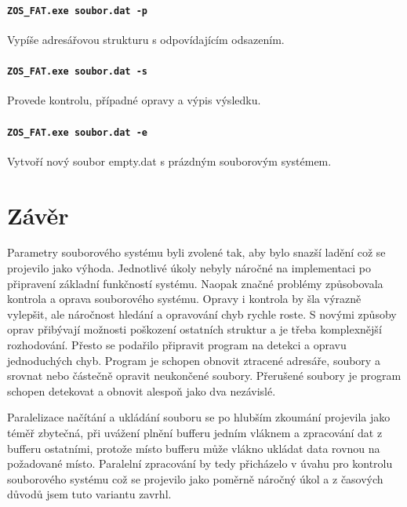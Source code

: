 \documentclass[12pt]{article}
\begin{document}
\paragraph{\texttt{ZOS\_FAT.exe soubor.dat -p}}
Vypíše adresářovou strukturu s odpovídajícím odsazením.

\paragraph{\texttt{ZOS\_FAT.exe soubor.dat -s}}
Provede kontrolu, případné opravy a výpis výsledku.

\paragraph{\texttt{ZOS\_FAT.exe soubor.dat -e}}
Vytvoří nový soubor empty.dat s prázdným souborovým systémem.

\section{Závěr}
Parametry souborového systému byli zvolené tak, aby bylo snazší ladění což se projevilo jako výhoda. Jednotlivé úkoly nebyly náročné na implementaci po připravení základní funkčností systému. Naopak značné problémy způsobovala kontrola a oprava souborového systému. Opravy i kontrola by šla výrazně vylepšit, ale náročnost hledání a opravování chyb rychle roste. S novými způsoby oprav přibývají možnosti poškození ostatních struktur a je třeba komplexnější rozhodování. Přesto se podařilo připravit program na detekci a opravu jednoduchých chyb. Program je schopen obnovit ztracené adresáře, soubory a srovnat nebo částečně opravit neukončené soubory. Přerušené soubory je program schopen detekovat a obnovit alespoň jako dva nezávislé.

Paralelizace načítání a ukládání souboru se po hlubším zkoumání projevila jako téměř zbytečná, při uvážení plnění bufferu jedním vláknem a zpracování dat z bufferu ostatními, protože místo bufferu může vlákno ukládat data rovnou na požadované místo. Paralelní zpracování by tedy přicházelo v úvahu pro kontrolu souborového systému což se projevilo jako poměrně náročný úkol a z časových důvodů jsem tuto variantu zavrhl.
\end{document}
